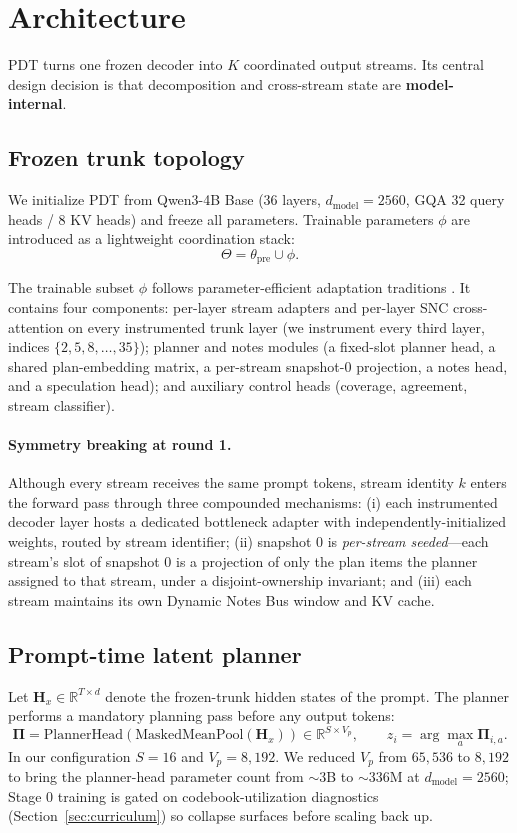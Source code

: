 \section{Architecture}

PDT turns one frozen decoder into $K$ coordinated output streams. Its central design decision is that decomposition and cross-stream state are \textbf{model-internal}.

\subsection{Frozen trunk topology}

We initialize PDT from Qwen3-4B Base (36 layers, $d_{\text{model}} = 2560$, GQA 32 query heads / 8 KV heads) and freeze all parameters. Trainable parameters $\phi$ are introduced as a lightweight coordination stack:
\[
\Theta = \theta_{\text{pre}} \cup \phi.
\]

The trainable subset $\phi$ follows parameter-efficient adaptation traditions \cite{hu2021lora,houlsby2019parameter}. It contains four components: per-layer stream adapters and per-layer SNC cross-attention on every instrumented trunk layer (we instrument every third layer, indices $\{2, 5, 8, \ldots, 35\}$); planner and notes modules (a fixed-slot planner head, a shared plan-embedding matrix, a per-stream snapshot-0 projection, a notes head, and a speculation head); and auxiliary control heads (coverage, agreement, stream classifier).

\paragraph{Symmetry breaking at round 1.} Although every stream receives the same prompt tokens, stream identity $k$ enters the forward pass through three compounded mechanisms: (i) each instrumented decoder layer hosts a dedicated bottleneck adapter with independently-initialized weights, routed by stream identifier; (ii) snapshot 0 is \emph{per-stream seeded}---each stream's slot of snapshot 0 is a projection of only the plan items the planner assigned to that stream, under a disjoint-ownership invariant; and (iii) each stream maintains its own Dynamic Notes Bus window and KV cache.

\subsection{Prompt-time latent planner}

Let $\mathbf{H}_x \in \mathbb{R}^{T \times d}$ denote the frozen-trunk hidden states of the prompt. The planner performs a mandatory planning pass before any output tokens:
\[
\mathbf{\Pi} = \mathrm{PlannerHead}(\mathrm{MaskedMeanPool}(\mathbf{H}_x)) \in \mathbb{R}^{S \times V_p}, \qquad z_i = \arg\max_{a} \mathbf{\Pi}_{i,a}.
\]
In our configuration $S = 16$ and $V_p = 8{,}192$. We reduced $V_p$ from $65{,}536$ to $8{,}192$ to bring the planner-head parameter count from ${\sim}3$B to ${\sim}336$M at $d_{\text{model}} = 2560$; Stage 0 training is gated on codebook-utilization diagnostics (Section~\ref{sec:curriculum}) so collapse surfaces before scaling back up.

